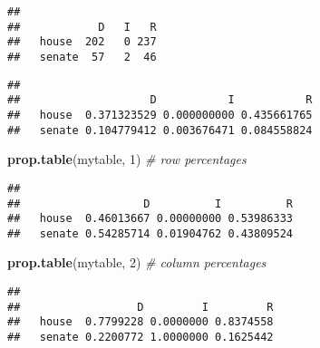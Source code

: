 \documentclass[]{book}
\newenvironment{Shaded}{\begin{snugshade}}{\end{snugshade}}
\newcommand{\KeywordTok}[1]{\textcolor[rgb]{0.13,0.29,0.53}{\textbf{#1}}}
\newcommand{\DecValTok}[1]{\textcolor[rgb]{0.00,0.00,0.81}{#1}}
\newcommand{\StringTok}[1]{\textcolor[rgb]{0.31,0.60,0.02}{#1}}
\newcommand{\CommentTok}[1]{\textcolor[rgb]{0.56,0.35,0.01}{\textit{#1}}}
\newcommand{\OperatorTok}[1]{\textcolor[rgb]{0.81,0.36,0.00}{\textbf{#1}}}
\newcommand{\NormalTok}[1]{#1}
\begin{document}
\begin{verbatim}
##         
##            D   I   R
##   house  202   0 237
##   senate  57   2  46
\end{verbatim}

\begin{Shaded}
\end{Shaded}

\begin{verbatim}
##         
##                    D           I           R
##   house  0.371323529 0.000000000 0.435661765
##   senate 0.104779412 0.003676471 0.084558824
\end{verbatim}

\begin{Shaded}
\begin{Highlighting}[]
\KeywordTok{prop.table}\NormalTok{(mytable, }\DecValTok{1}\NormalTok{) }\CommentTok{# row percentages}
\end{Highlighting}
\end{Shaded}

\begin{verbatim}
##         
##                   D          I          R
##   house  0.46013667 0.00000000 0.53986333
##   senate 0.54285714 0.01904762 0.43809524
\end{verbatim}

\begin{Shaded}
\begin{Highlighting}[]
\KeywordTok{prop.table}\NormalTok{(mytable, }\DecValTok{2}\NormalTok{) }\CommentTok{# column percentages}
\end{Highlighting}
\end{Shaded}

\begin{verbatim}
##         
##                  D         I         R
##   house  0.7799228 0.0000000 0.8374558
##   senate 0.2200772 1.0000000 0.1625442
\end{verbatim}

\begin{Shaded}
\end{Shaded}
\end{document}
